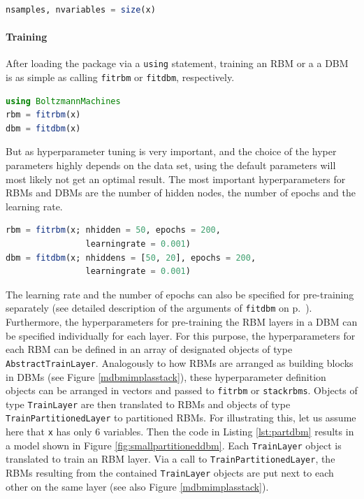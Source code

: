 \documentclass[12pt]{article}
\newcommand{\inlinecode}[1]{\texttt{#1}}
\begin{document}
\begin{lstlisting}[language=Julia]
nsamples, nvariables = size(x)
\end{lstlisting}

\paragraph{Training}\label{trainingimpl}

After loading the package via a \inlinecode{using} statement, training an RBM or a a DBM is as simple as calling \inlinecode{fitrbm} or \inlinecode{fitdbm}, respectively.

\begin{lstlisting}[language=Julia]
using BoltzmannMachines
rbm = fitrbm(x)
dbm = fitdbm(x)
\end{lstlisting}

But as hyperparameter tuning is very important, and the choice of the hyper parameters highly depends on the data set, using the default parameters will most likely not get an optimal result.
The most important hyperparameters for RBMs and DBMs are the number of hidden nodes, the number of epochs and the learning rate.

\begin{lstlisting}[language=Julia]
rbm = fitrbm(x; nhidden = 50, epochs = 200,
                learningrate = 0.001)
dbm = fitdbm(x; nhiddens = [50, 20], epochs = 200,
                learningrate = 0.001)
\end{lstlisting}

The learning rate and the number of epochs can also be specified for pre-training separately (see detailed description of the arguments of \inlinecode{fitdbm} on p.\ \pageref{bms_fitdbm}).
Furthermore, the hyperparameters for pre-training the RBM layers in a DBM can be specified individually for each layer.
For this purpose, the hyperparameters for each RBM can be defined in an array of designated objects of type \inlinecode{AbstractTrainLayer}.
Analogously to how RBMs are arranged as building blocks in DBMs (see Figure \ref{mdbmimplasstack}), these hyperparameter definition objects can be arranged in vectors and passed to \inlinecode{fitrbm} or \inlinecode{stackrbms}.
Objects of type \inlinecode{TrainLayer} are then translated to RBMs and objects of type \inlinecode{TrainPartitionedLayer} to partitioned RBMs.
For illustrating this, let us assume here that \inlinecode{x} has only 6 variables.
Then the code in Listing \ref{lst:partdbm} results in a model shown in Figure \ref{fig:smallpartitioneddbm}.
Each \inlinecode{TrainLayer} object is translated to train an RBM layer.
Via a call to \inlinecode{TrainPartitionedLayer}, the RBMs resulting from the contained \inlinecode{TrainLayer} objects are put next to each other on the same layer (see also Figure \ref{mdbmimplasstack}).
\end{document}
